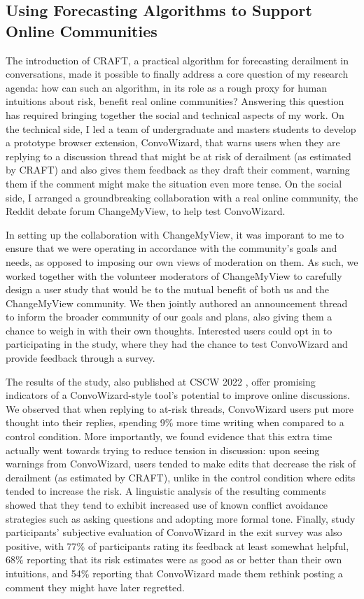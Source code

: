 \documentclass[11pt,letterpaper]{article}
\begin{document}
\subsection{Using Forecasting Algorithms to Support Online Communities}
The introduction of CRAFT, a practical algorithm for forecasting derailment in conversations, made it possible to finally address a core question of my research agenda: how can such an algorithm, in its role as a rough proxy for human intuitions about risk, benefit real online communities?
Answering this question has required bringing together the social and technical aspects of my work.
On the technical side, I led a team of undergraduate and masters students to develop a prototype browser extension, ConvoWizard, that warns users when they are replying to a discussion thread that might be at risk of derailment (as estimated by CRAFT) and also gives them feedback as they draft their comment, warning them if the comment might make the situation even more tense.
On the social side, I arranged a groundbreaking collaboration with a real online community, the Reddit debate forum ChangeMyView, to help test ConvoWizard.

In setting up the collaboration with ChangeMyView, it was imporant to me to ensure that we were operating in accordance with the community's goals and needs, as opposed to imposing our own views of moderation on them.
As such, we worked together with the volunteer moderators of ChangeMyView to carefully design a user study that would be to the mutual benefit of both us and the ChangeMyView community.
We then jointly authored an announcement thread to inform the broader community of our goals and plans, also giving them a chance to weigh in with their own thoughts.
Interested users could opt in to participating in the study, where they had the chance to test ConvoWizard and provide feedback through a survey.

The results of the study, also published at CSCW 2022 \cite{chang_thread_2022}, offer promising indicators of a ConvoWizard-style tool's potential to improve online discussions.
We observed that when replying to at-risk threads, ConvoWizard users put more thought into their replies, spending 9\% more time writing when compared to a control condition.
More importantly, we found evidence that this extra time actually went towards trying to reduce tension in discussion: upon seeing warnings from ConvoWizard, users tended to make edits that decrease the risk of derailment (as estimated by CRAFT), unlike in the control condition where edits tended to increase the risk.
A linguistic analysis of the resulting comments showed that they tend to exhibit increased use of known conflict avoidance strategies such as asking questions and adopting more formal tone.
Finally, study participants' subjective evaluation of ConvoWizard in the exit survey was also positive, with 77\% of participants rating its feedback at least somewhat helpful, 68\% reporting that its risk estimates were as good as or better than their own intuitions, and 54\% reporting that ConvoWizard made them rethink posting a comment they might have later regretted.
\end{document}
